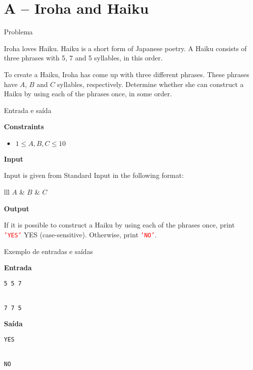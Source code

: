 \section{A -- Iroha and Haiku}

\begin{frame}[fragile]{Problema}

Iroha loves Haiku. Haiku is a short form of Japanese poetry. A Haiku consists of three phrases with 
5, 7 and 5 syllables, in this order.

To create a Haiku, Iroha has come up with three different phrases. These phrases have $A$, $B$ and 
$C$ syllables, respectively. Determine whether she can construct a Haiku by using each of the
phrases once, in some order.

\end{frame}

\begin{frame}[fragile]{Entrada e saída}

\textbf{Constraints}

\begin{itemize}
    \item $1\leq A, B, C\leq 10$
\end{itemize}

\vspace{0.1in}

\textbf{Input}

Input is given from Standard Input in the following format:
\begin{atcoderio}{lll}
$A$ & $B$ & $C$ \\
\end{atcoderio}

\textbf{Output}

If it is possible to construct a Haiku by using each of the phrases once, print
\texttt{\textcolor{red}{'YES'}} YES (case-sensitive). Otherwise, print 
\texttt{\textcolor{red}{'NO'}}.

\end{frame}

\begin{frame}[fragile]{Exemplo de entradas e saídas}

\begin{minipage}[t]{0.45\textwidth}
\textbf{Entrada}
\begin{verbatim}
5 5 7


7 7 5
\end{verbatim}
\end{minipage}
\begin{minipage}[t]{0.5\textwidth}
\textbf{Saída}
\begin{verbatim}
YES


NO
\end{verbatim}
\end{minipage}
\end{frame}

